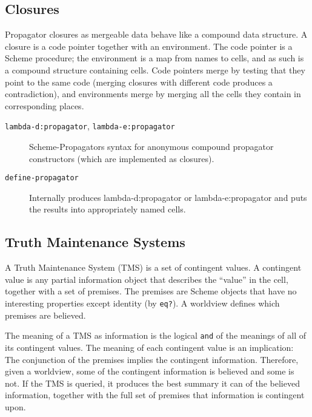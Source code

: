 \documentclass[12pt,letterpaper,english]{article}
\begin{document}

\hypertarget{closures}{}
\subsection{Closures}
\label{closures}

Propagator closures as mergeable data behave like a compound data
structure.  A closure is a code pointer together with an environment.
The code pointer is a Scheme procedure; the environment is a map from
names to cells, and as such is a compound structure containing cells.
Code pointers merge by testing that they point to the same code
(merging closures with different code produces a contradiction), and
environments merge by merging all the cells they contain in
corresponding places.
\begin{description}
\item[{\texttt{lambda-d:propagator}, \texttt{lambda-e:propagator}}] \leavevmode 
Scheme-Propagators syntax for anonymous compound propagator
constructors (which are implemented as closures).

\item[{\texttt{define-propagator}}] \leavevmode 
Internally produces lambda-d:propagator or lambda-e:propagator
and puts the results into appropriately named cells.

\end{description}



\hypertarget{truth-maintenance-systems}{}
\subsection{Truth Maintenance Systems}
\label{truth-maintenance-systems}

A Truth Maintenance System (TMS) is a set of contingent values.  A
contingent value is any partial information object that describes the
``value'' in the cell, together with a set of premises.  The premises
are Scheme objects that have no interesting properties except identity
(by \texttt{eq?}).  A worldview defines which premises are believed.

The meaning of a TMS as information is the logical \texttt{and} of the
meanings of all of its contingent values.  The meaning of each
contingent value is an implication: The conjunction of the premises
implies the contingent information.  Therefore, given a worldview,
some of the contingent information is believed and some is not.  If
the TMS is queried, it produces the best summary it can of the
believed information, together with the full set of premises that
information is contingent upon.
\end{document}
